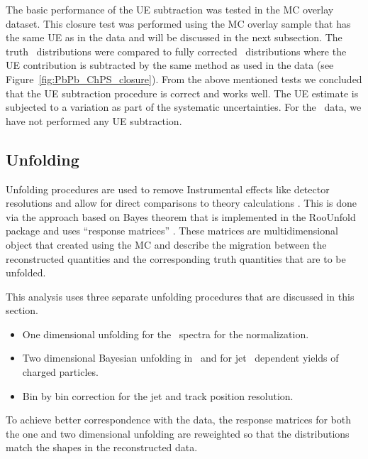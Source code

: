 The basic performance of the UE subtraction was tested in the MC overlay dataset.
This closure test was performed using the MC overlay sample that has the same UE as in the data and will be discussed in the next subsection.
The truth \Rdptr\ distributions were compared to fully corrected \Rdptr\ distributions where the UE contribution is subtracted by the same method as used in the data (see Figure~\ref{fig:PbPb_ChPS_closure}).
From the above mentioned tests we concluded that the UE subtraction procedure is correct and works well.
The UE estimate is subjected to a variation as part of the systematic uncertainties.
For the \pp\ data, we have not performed any UE subtraction.



\subsection{Unfolding}
\label{sec:unfolding}

Unfolding procedures are used to remove Instrumental effects like detector resolutions and allow for direct comparisons to theory calculations \cite{DAgostini:1994zf}.
This is done via the approach based on Bayes theorem that is implemented in the RooUnfold package and uses ``response matrices'' \cite{Adye:2011gm}.
These matrices are multidimensional object that created using the MC and describe the migration between the reconstructed quantities and the corresponding truth quantities that are to be unfolded.

This analysis uses three separate unfolding procedures that are discussed in this section.

\begin{itemize}
\item One dimensional unfolding for the \ptjet\ spectra for the normalization.
\item Two dimensional Bayesian unfolding in \pttrk\ and \ptjet for jet \pt\ dependent yields of charged particles.
\item Bin by bin correction for the jet and track position resolution.
\end{itemize}

To achieve better correspondence with the data, the response matrices for both the one and two dimensional unfolding are reweighted so that the distributions match the shapes in the reconstructed data.

